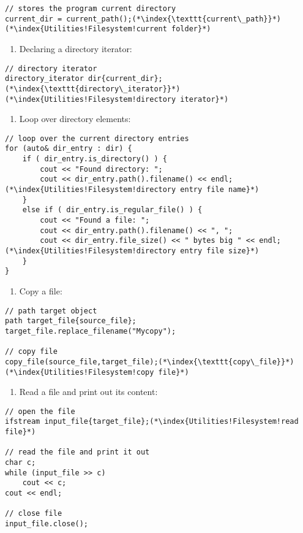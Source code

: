 \documentclass[10pt]{book}
\begin{document}
\begin{lstlisting}    
// stores the program current directory
current_dir = current_path();(*\index{\texttt{current\_path}}*)(*\index{Utilities!Filesystem!current folder}*)
\end{lstlisting}
\begin{enumerate}
\item[] Declaring a directory iterator:
\end{enumerate}
\begin{lstlisting}    
// directory iterator
directory_iterator dir{current_dir};(*\index{\texttt{directory\_iterator}}*)(*\index{Utilities!Filesystem!directory iterator}*)
\end{lstlisting}
\begin{enumerate}
\item[] Loop over directory elements:
\end{enumerate}
\begin{lstlisting}    
// loop over the current directory entries
for (auto& dir_entry : dir) {
    if ( dir_entry.is_directory() ) {
        cout << "Found directory: ";
        cout << dir_entry.path().filename() << endl;(*\index{Utilities!Filesystem!directory entry file name}*)
    }
    else if ( dir_entry.is_regular_file() ) {
        cout << "Found a file: ";
        cout << dir_entry.path().filename() << ", ";
        cout << dir_entry.file_size() << " bytes big " << endl;(*\index{Utilities!Filesystem!directory entry file size}*)
    }
}
\end{lstlisting}
\begin{enumerate}
\item[] Copy a file:
\end{enumerate}
\begin{lstlisting}
// path target object
path target_file{source_file};
target_file.replace_filename("Mycopy");
    
// copy file
copy_file(source_file,target_file);(*\index{\texttt{copy\_file}}*)(*\index{Utilities!Filesystem!copy file}*)
\end{lstlisting}
\begin{enumerate}
\item[] Read a file and print out its content:
\end{enumerate}
\begin{lstlisting}
// open the file
ifstream input_file{target_file};(*\index{Utilities!Filesystem!read file}*)
    
// read the file and print it out
char c; 
while (input_file >> c)
    cout << c;
cout << endl;
    
// close file
input_file.close();
\end{lstlisting}
\end{document}
